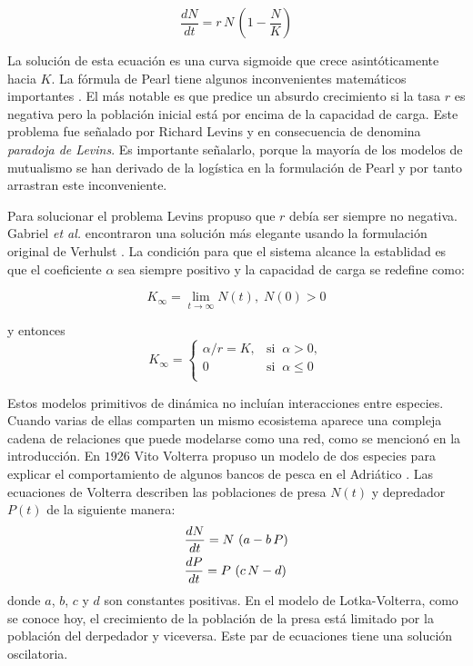 \begin{equation}
\frac{dN}{dt}=r \, N \, \left(1-\frac{N}{K}\right)
\label{pearl}
\end{equation}

La solución de esta ecuación es una curva sigmoide que crece asintóticamente hacia $K$. La fórmula de Pearl tiene algunos inconvenientes matemáticos importantes \citep{kuno1991some,gabriel2005paradoxes}. El más notable es que predice un absurdo crecimiento si la tasa $r$ es negativa pero la población inicial está por encima de la capacidad de carga. Este problema fue señalado por Richard Levins y en consecuencia de denomina \textit{paradoja de Levins}. Es importante señalarlo, porque la mayoría de los modelos de mutualismo se han derivado de la logística en la formulación de Pearl y por tanto arrastran este inconveniente.

Para solucionar el problema Levins propuso que $r$ debía ser siempre no negativa. Gabriel \emph{et al.} encontraron una solución más elegante usando la formulación original de Verhulst \cite{gabriel2005paradoxes}. La condición para que el sistema alcance la establidad es que el coeficiente $\alpha$ sea siempre positivo y la capacidad de carga se redefine como:

\begin{equation}
K_{\infty}=\lim_{t\rightarrow\infty}N(t),\; N(0)>0
\end{equation}

\noindent y entonces
\begin{equation*}
K_{\infty}=\left\{
\begin{array}{ll}
  \alpha / r = K, & \mathrm{si} \;\; \alpha > 0, \\ 0  & \mathrm{si} \;\; \alpha \le0 \\
  \end{array} \right.
\end{equation*}

Estos modelos primitivos de dinámica no incluían interacciones entre especies. Cuando varias de ellas comparten un mismo ecosistema aparece una compleja cadena de relaciones que puede modelarse como una red, como se mencionó en la introducción. En $1926$ Vito Volterra propuso un modelo de dos especies para explicar el comportamiento de algunos bancos de pesca en el Adriático \cite{volterra1926}. Las ecuaciones de Volterra describen las poblaciones de presa $N(t)$ y depredador $P(t)$ de la siguiente manera: 
\begin{align}
\displaystyle &\frac{dN}{dt}=N\, \left(a-b \,P\right) \nonumber\\
\displaystyle &\frac{dP}{dt}=P\, \left(c\, N-d\right) 
\label{myeq1}
\end{align}
\noindent donde $a$, $b$, $c$ y $d$ son constantes positivas. En el modelo de Lotka-Volterra, como se conoce hoy, el crecimiento de la población de la presa está limitado por la población del derpedador y viceversa. Este par de ecuaciones tiene una solución oscilatoria.

